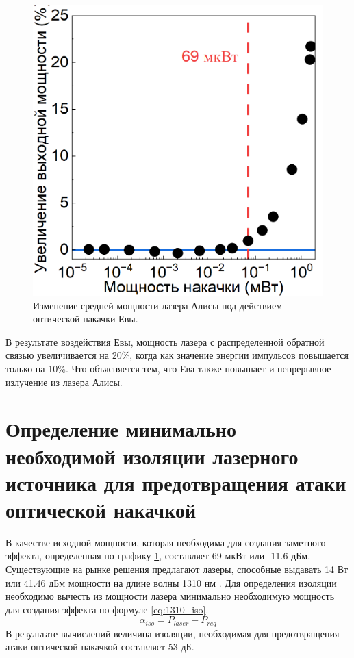 \begin{figure}
    \centering
    \includegraphics{images/1310_мощность.png}
    \caption{Изменение средней мощности лазера Алисы под действием оптической накачки Евы.}
    \label{fig:avg pwr 1310 ch4}
\end{figure}
В результате воздействия Евы, мощность лазера с распределенной обратной связью увеличивается на 20\%, когда как значение энергии импульсов повышается только на 10\%. Что объясняется тем, что Ева также повышает и непрерывное излучение из лазера Алисы.
\section{Определение минимально необходимой изоляции лазерного источника для предотвращения атаки оптической накачкой}\label{sec:ch4/sect5}
В качестве исходной мощности, которая необходима для создания заметного эффекта, определенная по графику \ref{fig:avg pwr 1310 ch4}, составляет 69 мкВт или -11.6 дБм. Существующие на рынке решения предлагают лазеры, способные выдавать 14 Вт или 41.46 дБм мощности на длине волны 1310 нм \cite{grimes2022}.
Для определения изоляции необходимо вычесть из мощности лазера минимально необходимую мощность для создания эффекта по формуле \ref{eq:1310_iso}.
\begin{equation}
\label{eq:1310_iso}
    \alpha_{iso} = P_{laser} - P_{req}
\end{equation}
В результате вычислений величина изоляции, необходимая для предотвращения атаки оптической накачкой составляет 53 дБ. 

